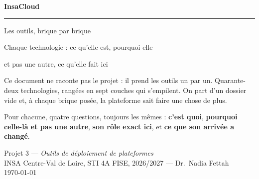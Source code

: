 \documentclass[a4paper,11pt,oneside]{report}
\begin{document}
\begin{titlepage}
\centering
\vspace*{2.2cm}

{\Huge\bfseries InsaCloud\par}
\vspace{6pt}
{\color{insared}\rule{4cm}{2pt}\par}
\vspace{16pt}
{\LARGE Les outils, brique par brique\par}
\vspace{10pt}
{\large Chaque technologie : ce qu'elle est, pourquoi elle\par}
{\large et pas une autre, ce qu'elle fait ici\par}

\vspace{2cm}
\begin{minipage}{0.84\textwidth}
\color{gristexte}\small
Ce document ne raconte pas le projet : il prend les outils un par un.
Quarante-deux technologies, rangées en sept couches qui s'empilent. On part
d'un dossier vide et, à chaque brique posée, la plateforme sait faire une chose
de plus.

\medskip
Pour chacune, quatre questions, toujours les mêmes : \textbf{c'est quoi},
\textbf{pourquoi celle-là et pas une autre}, \textbf{son rôle exact ici}, et
\textbf{ce que son arrivée a changé}.
\end{minipage}

\vfill
{\color{gristexte}\small
Projet 3 --- \textit{Outils de déploiement de plateformes}\\
INSA Centre-Val de Loire, STI 4A FISE, 2026/2027 --- Dr.~Nadia Fettah\\[8pt]
\today\par}
\end{titlepage}

\setcounter{tocdepth}{1}
\tableofcontents
\cleardoublepage
{}










\end{document}
